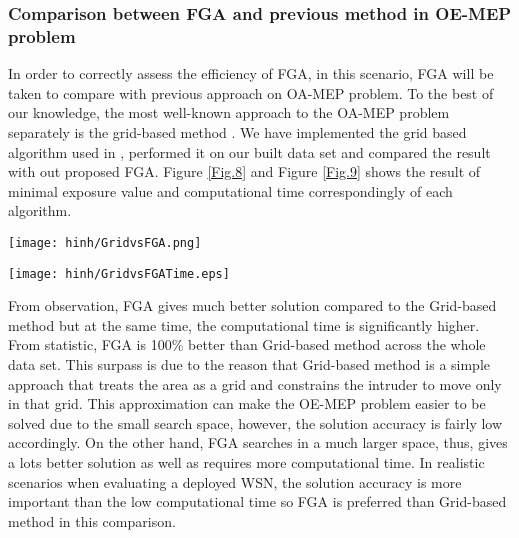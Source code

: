 \documentclass[final]{elsarticle}
\begin{document}
\subsubsection{Comparison between FGA and previous method in OE-MEP problem}
In order to correctly assess the efficiency of FGA, in this scenario, FGA will be taken to compare with previous approach on OA-MEP problem. To the best of our knowledge, the most well-known approach to the OA-MEP problem separately is the grid-based method \cite{liu2017obstacle}. We have implemented the grid based algorithm used in \cite{liu2017obstacle}, performed it on our built data set and compared the result with out proposed FGA. Figure \ref{Fig.8} and Figure \ref{Fig.9} shows the result of minimal exposure value and computational time correspondingly of each algorithm.
\begin{figure*}[h]
	\texttt{[image: hinh/GridvsFGA.png]}
	\centering
	\caption{The Minimal Exposure Value comparison between FGA and Grid based method on some noble topologies
	}
	\label{Fig.8}       %
\end{figure*}
\begin{figure*}[h]
	\texttt{[image: hinh/GridvsFGATime.eps]}
	\centering
	\caption{The Computational Time (sec) comparison between FGA and Grid based method on some noble topologies
	}
	\label{Fig.9}       %
\end{figure*}

From observation, FGA gives much better solution compared to the Grid-based method but at the same time, the computational time is significantly higher. From statistic, FGA is 100\% better than Grid-based method across the whole data set. This surpass is due to the reason that Grid-based method is a simple approach that treats the area as a grid and constrains the intruder to move only in that grid. This approximation can make the OE-MEP problem easier to be solved due to the small search space, however, the solution accuracy is fairly low accordingly. On the other hand, FGA searches in a much larger space, thus, gives a lots better solution as well as requires more computational time. In realistic scenarios when evaluating a deployed WSN, the solution accuracy is more important than the low computational time so FGA is preferred than Grid-based method in this comparison. 
\end{document}
